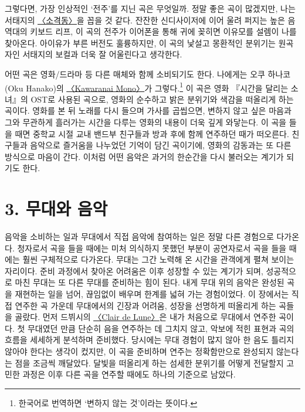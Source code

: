 \documentclass{article}
\let\plainhref\href
\renewcommand{\href}[2]{\plainhref{#1}{\underline{#2}}}
\begin{document}
 \indent 그렇다면, 가장 인상적인 `전주'를 지닌 곡은 무엇일까. 정말 좋은 곡이 많겠지만, 나는 서태지의 \href{https://youtu.be/WH0iiU0cv00?si=09eEQ3rWFntj04CE}{〈소격동〉}을 꼽을 것 같다. 잔잔한 신디사이저에 이어 울려 퍼지는 높은 음역대의 키보드 리프, 이 곡의 전주가 이어폰을 통해 귀에 꽂히면 이유모를 설렘이 나를 찾아온다. 아이유가 부른 버전도 훌륭하지만, 이 곡의 낯설고 몽환적인 분위기는 원곡자인 서태지의 보컬과 더욱 잘 어울린다고 생각한다. 
\medskip

 \indent 어떤 곡은 영화/드라마 등 다른 매체와 함께 소비되기도 한다. 나에게는 오쿠 하나코(Oku Hanako)의 \href{https://youtu.be/nFG3l5zxLdM?si=ev76Dob4Z8KvGms0}{〈Kawaranai Mono〉}가 그렇다.\footnote{한국어로 번역하면 `변하지 않는 것'이라는 뜻이다.} 이 곡은  영화 『시간을 달리는 소녀』의 OST로 사용된 곡으로, 영화의 순수하고 밝은 분위기와 색감을 떠올리게 하는 곡이다. 영화를 본 뒤 노래를 다시 들으며 가사를 곱씹으면, 변하지 않고 싶은 마음과 그와 무관하게 흘러가는 시간을 다루는 영화의 내용이 더욱 깊게 와닿는다. 이 곡을 들을 때면 중학교 시절 교내 밴드부 친구들과 방과 후에 함께 연주하던 때가 떠오른다. 친구들과 음악으로 즐거움을 나누었던 기억이 담긴 곡이기에, 영화의 감동과는 또 다른 방식으로 마음이 간다. 이처럼 어떤 음악은 과거의 한순간을 다시 불러오는 계기가 되기도 한다.

\section{3. 무대와 음악}
\label{sec.3}

\indent 음악을 소비하는 일과 무대에서 직접 음악에 참여하는 일은 정말 다른 경험으로 다가온다. 청자로서 곡을 들을 때에는 미처 의식하지 못했던 부분이 공연자로서 곡을 들을 때에는 훨씬 구체적으로 다가온다. 무대는 그간 노력해 온 시간을 관객에게 펼쳐 보이는 자리이다. 준비 과정에서 찾아온 어려움은 이후 성장할 수 있는 계기가 되며, 성공적으로 마친 무대는 또 다른 무대를 준비하는 힘이 된다. 내게 무대 위의 음악은 완성된 곡을 재현하는 일을 넘어, 끊임없이 배우며 한계를 넓혀 가는 경험이었다. 이 장에서는 직접 연주한 곡 가운데 무대에서의 긴장과 어려움, 성장을 선명하게 떠올리게 하는 곡들을 골랐다. 먼저 드뷔시의 \href{https://youtu.be/97_VJve7UVc?si=0hGs_9ZKxS90MSxx}{〈Clair de Lune〉}은 내가 처음으로 무대에서 연주한 곡이다. 첫 무대였던 만큼 단순히 음을 연주하는 데 그치지 않고, 악보에 적힌 표현과 곡의 흐름을 세세하게 분석하며 준비했다. 당시에는 무대 경험이 많지 않아 한 음도 틀리지 않아야 한다는 생각이 컸지만, 이 곡을 준비하며 연주는 정확함만으로 완성되지 않는다는 점을 조금씩 깨달았다. 달빛을 떠올리게 하는 섬세한 분위기를 어떻게 전달할지 고민한 과정은 이후 다른 곡을 연주할 때에도 하나의 기준으로 남았다.
\medskip
\end{document}
